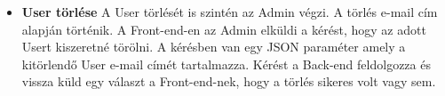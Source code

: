 \begin{itemize}
	\item \textbf{User törlése}
A User törlését is szintén az Admin végzi. A törlés e-mail cím alapján történik. A Front-end-en az Admin elküldi a kérést, hogy az adott Usert kiszeretné törölni. A kérésben van egy JSON paraméter amely a kitörlendő User e-mail címét tartalmazza. Kérést a Back-end feldolgozza és vissza küld egy választ a Front-end-nek, hogy a törlés sikeres volt vagy sem.
\end{itemize}
